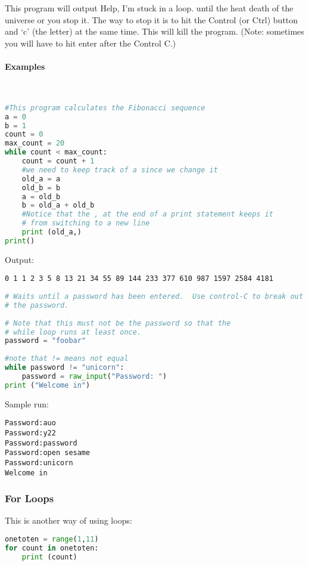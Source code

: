 This program will output Help, I'm stuck in a loop. until the heat death of the
universe or you stop it. The way to stop it is to hit the Control (or Ctrl)
button and `c' (the letter) at the same time. This will kill the program. (Note:
sometimes you will have to hit enter after the Control C.)

\paragraph{Examples}~

\lstset{basicstyle=\scriptsize, numbers=left, captionpos=b, tabsize=4}
\begin{lstlisting}[caption=Fibonacci.py,language={Python},
xleftmargin=15pt, label=lst:fibonacci]
#This program calculates the Fibonacci sequence
a = 0
b = 1
count = 0
max_count = 20
while count < max_count:
    count = count + 1
    #we need to keep track of a since we change it
    old_a = a
    old_b = b
    a = old_b
    b = old_a + old_b
    #Notice that the , at the end of a print statement keeps it
    # from switching to a new line
    print (old_a,)
print()
\end{lstlisting}

Output:
\scriptsize
\begin{verbatim}
0 1 1 2 3 5 8 13 21 34 55 89 144 233 377 610 987 1597 2584 4181
\end{verbatim}
\normalsize

\lstset{basicstyle=\scriptsize, numbers=left, captionpos=b, tabsize=4}
\begin{lstlisting}[caption=Password.py,language={Python},
xleftmargin=15pt, label=lst:password]
# Waits until a password has been entered.  Use control-C to break out without
# the password.
 
# Note that this must not be the password so that the 
# while loop runs at least once.
password = "foobar"
 
#note that != means not equal
while password != "unicorn":
    password = raw_input("Password: ")
print ("Welcome in")
\end{lstlisting}

Sample run:
\scriptsize
\begin{verbatim}
Password:auo
Password:y22
Password:password
Password:open sesame
Password:unicorn
Welcome in
\end{verbatim}
\normalsize

\subsubsection{For Loops}
This is another way of using loops:
\lstset{basicstyle=\scriptsize, numbers=left, captionpos=b, tabsize=4}
\begin{lstlisting}[caption=For Loop Range 1,language={Python},
xleftmargin=15pt, label=lst:forlooprange1]
onetoten = range(1,11)
for count in onetoten:
    print (count)
\end{lstlisting}

